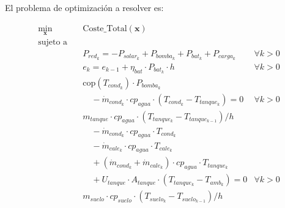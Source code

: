 El problema de optimización a resolver es:

\begin{align}
	\min_{\mathbf{x}} \quad & \text{Coste\_Total}(\mathbf{x}) \label{eq:sand_control_optimization}                                                                           \\
	\text{sujeto a} \quad   & \nonumber                                                                                                                                      \\
	                        & P_{red_k} = -P_{solar_k} + P_{bomba_k} + P_{bat_k} + P_{carga_k} \quad                                                         & \forall k > 0 \\
	                        & e_k = e_{k-1} + \eta_{bat} \cdot P_{bat_k} \cdot h \quad                                                                       & \forall k > 0 \\
	                        & \text{cop}(T_{cond_k}) \cdot P_{bomba_k} \nonumber                                                                                             \\
	                        & \quad - \dot{m}_{cond_k} \cdot cp_{agua} \cdot (T_{cond_k} - T_{tanque_k}) = 0 \label{eq:sys_1_sand}                           & \forall k > 0 \\
	                        & m_{tanque} \cdot cp_{agua} \cdot ( T_{tanque_k} - T_{tanque_{k-1}}) / h  \nonumber                                                             \\
	                        & \quad - \dot{m}_{cond_k} \cdot cp_{agua} \cdot T_{cond_k} \nonumber                                                                            \\
	                        & \quad - \dot{m}_{cale_k} \cdot cp_{agua} \cdot T_{cale_k} \nonumber                                                                            \\
	                        & \quad + (\dot{m}_{cond_k} + \dot{m}_{cale_k}) \cdot cp_{agua} \cdot T_{tanque_k} \nonumber                                                     \\
	                        & \quad + U_{tanque} \cdot A_{tanque} \cdot (T_{tanque_k} - T_{amb_k}) = 0 \label{eq:sys_2_sand}                                 & \forall k > 0 \\
	                        & m_{suelo} \cdot cp_{suelo} \cdot ( T_{suelo_k} - T_{suelo_{k-1}}) / h \nonumber                                                                \\

\end{align}
